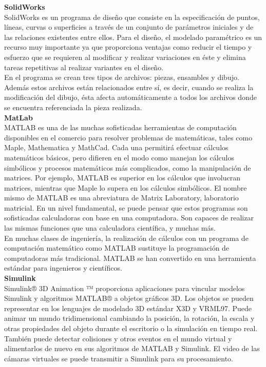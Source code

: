 \textbf{SolidWorks}\\
SolidWorks es un programa de diseño que consiste en la especificación de puntos, líneas, curvas o superficies a través de un conjunto de parámetros iniciales y de las relaciones existentes entre ellos. Para el diseño, el modelado paramétrico es un recurso muy importante ya que proporciona ventajas como reducir el tiempo y esfuerzo que se requieren al modificar y realizar variaciones en éste y elimina tareas repetitivas al realizar variantes en el diseño.\\

En el programa se crean tres tipos de archivos: piezas, ensambles y dibujo. Además estos archivos están relacionados entre sí, es decir, cuando se realiza la modificación del dibujo, ésta afecta automáticamente a todos los archivos donde se encuentra referenciada la pieza realizada. \cite{herrera-2016} \\

\newpage
\textbf{MatLab}\\
MATLAB es una de las muchas sofisticadas herramientas de computación disponibles en el comercio para resolver problemas de matemáticas, tales como Maple, Mathematica y MathCad. Cada una permitirá efectuar cálculos matemáticos básicos, pero difieren en el modo como manejan los cálculos simbólicos y procesos matemáticos más complicados, como la manipulación de matrices. Por ejemplo, MATLAB es superior en los cálculos que involucran matrices, mientras que Maple lo supera en los cálculos simbólicos. El nombre mismo de MATLAB es una abreviatura de Matrix Laboratory, laboratorio matricial. En un nivel fundamental, se puede pensar que estos programas son sofisticadas calculadoras con base en una computadora. Son capaces de realizar las mismas funciones que una calculadora científica, y muchas más.\\
En muchas clases de ingeniería, la realización de cálculos con un programa de computación matemático como MATLAB sustituye la programación de computadoras más tradicional. MATLAB se han convertido en una herramienta estándar para ingenieros y científicos. \cite{moore-2007}\\

\textbf{Simulink}\\
Simulink® 3D Animation ™ proporciona aplicaciones para vincular modelos Simulink y algoritmos MATLAB® a objetos gráficos 3D. Los objetos se pueden representar en los lenguajes de modelado 3D estándar X3D y VRML97. Puede animar un mundo tridimensional cambiando la posición, la rotación, la escala y otras propiedades del objeto durante el escritorio o la simulación en tiempo real. También puede detectar colisiones y otros eventos en el mundo virtual y alimentarlos de nuevo en sus algoritmos de MATLAB y Simulink. El video de las cámaras virtuales se puede transmitir a Simulink para su procesamiento.

